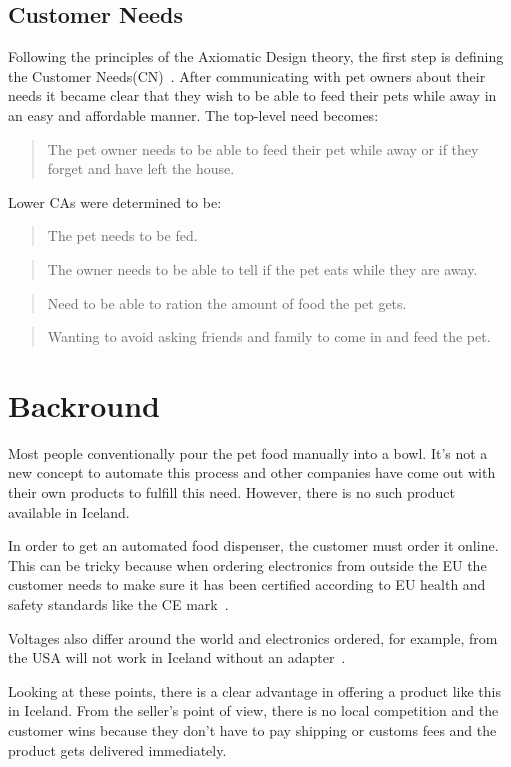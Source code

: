 \documentclass[twocolumn]{webofc}
\begin{document}
\subsection{Customer Needs}
Following the principles of the Axiomatic Design theory, the first step is defining the Customer Needs(CN)~\cite{suh1990principles}.
After communicating with pet owners about their needs it became clear that they wish to be able to feed their pets while away in an easy and affordable manner.
The top-level need  becomes:
\begin{quote} \textbf{} The pet owner needs to be able to feed their pet while away or if they forget and have left the house.
\end{quote}
Lower CAs were determined to be:
\begin{quote} \textbf{} The pet needs to be fed.
\end{quote}
\begin{quote} \textbf{} The owner needs to be able to tell if the pet eats while they are away.
\end{quote}
\begin{quote} \textbf{} Need to be able to ration the amount of food the pet gets.
\end{quote}
\begin{quote} \textbf{} Wanting to avoid asking friends and family to come in and feed the pet.
\end{quote}





\section{Backround}
Most people conventionally pour the pet food manually into a bowl.
It’s not a new concept to automate this process and other companies have come out with their own products to fulfill this need.
However, there is no such product available in Iceland.

In order to get an automated food dispenser, the customer must order it online.
This can be tricky because when ordering electronics from outside the EU the customer needs to make sure it has been certified according to EU health and safety standards like the CE mark~\cite{CE_mark}.

Voltages also differ around the world and electronics ordered, for example, from the USA will not work in Iceland without an adapter~\cite{adapters_outlets}.

Looking at these points, there is a clear advantage in offering a product like this in Iceland. From the seller's point of view, there is no local competition and the customer wins because they don't have to pay shipping or customs fees and the product gets delivered immediately. 
\end{document}
